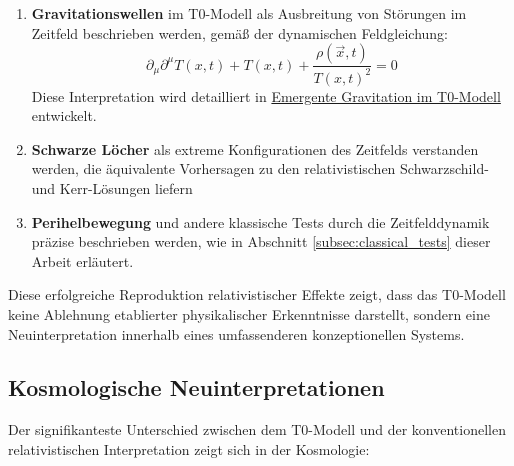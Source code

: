 \documentclass[12pt,a4paper]{article}
\newcommand{\Tfieldt}{T(x,t)}
\newcommand{\vecx}{\vec{x}}
\begin{document}
	\begin{enumerate}
		\item \textbf{Gravitationswellen} im T0-Modell als Ausbreitung von Störungen im Zeitfeld beschrieben werden, gemäß der dynamischen Feldgleichung:
		\begin{equation}
			\partial_{\mu}\partial^{\mu}\Tfieldt + \Tfieldt + \frac{\rho(\vecx,t)}{\Tfieldt^2} = 0
		\end{equation}
		Diese Interpretation wird detailliert in \href{https://github.com/jpascher/T0-Time-Mass-Duality/tree/main/2/pdf/English/EmergentGravT0En.pdf}{Emergente Gravitation im T0-Modell} entwickelt.
		
		\item \textbf{Schwarze Löcher} als extreme Konfigurationen des Zeitfelds verstanden werden, die äquivalente Vorhersagen zu den relativistischen Schwarzschild- und Kerr-Lösungen liefern
		
		\item \textbf{Perihelbewegung} und andere klassische Tests durch die Zeitfelddynamik präzise beschrieben werden, wie in Abschnitt \ref{subsec:classical_tests} dieser Arbeit erläutert.
	\end{enumerate}
	
	Diese erfolgreiche Reproduktion relativistischer Effekte zeigt, dass das T0-Modell keine Ablehnung etablierter physikalischer Erkenntnisse darstellt, sondern eine Neuinterpretation innerhalb eines umfassenderen konzeptionellen Systems.
	
	\subsection{Kosmologische Neuinterpretationen}
	\label{subsec:cosmological_reinterpretation}
	
	Der signifikanteste Unterschied zwischen dem T0-Modell und der konventionellen relativistischen Interpretation zeigt sich in der Kosmologie:
	
\end{document}

